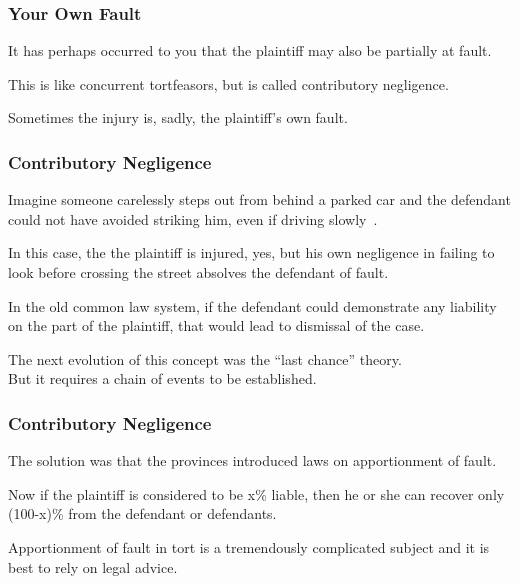 \begin{frame}
\frametitle{Your Own Fault}

It has perhaps occurred to you that the plaintiff may also be partially at fault.

This is like concurrent tortfeasors, but is called \alert{contributory negligence}.

Sometimes the injury is, sadly, the plaintiff's own fault.

\end{frame}



\begin{frame}
\frametitle{Contributory Negligence}

Imagine someone carelessly steps out from behind a parked car and the defendant could not have avoided striking him, even if driving slowly~\cite{lba}.

In this case, the the plaintiff is injured, yes, but his own negligence in failing to look before crossing the street absolves the defendant of fault.

In the old common law system, if the defendant could demonstrate any liability on the part of the plaintiff, that would lead to dismissal of the case.

The next evolution of this concept was the ``last chance'' theory.\\
\quad But it requires a chain of events to be established.

\end{frame}



\begin{frame}
\frametitle{Contributory Negligence}

The solution was that the provinces introduced laws on apportionment of fault.

Now if the plaintiff is considered to be x\% liable, then he or she can recover only (100-x)\% from the defendant or defendants.

Apportionment of fault in tort is a tremendously complicated subject and it is best to rely on legal advice. 

\end{frame}





